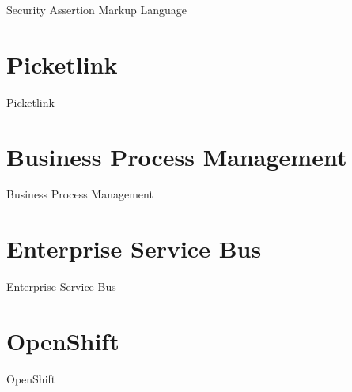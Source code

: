Security Assertion Markup Language


\section{Picketlink}
\label{sec:picketlink}

Picketlink


\section{Business Process Management}
\label{sec:bpm}

Business Process Management


\section{Enterprise Service Bus}
\label{sec:esb}

Enterprise Service Bus


\section{OpenShift}
\label{sec:openShift}

OpenShift

